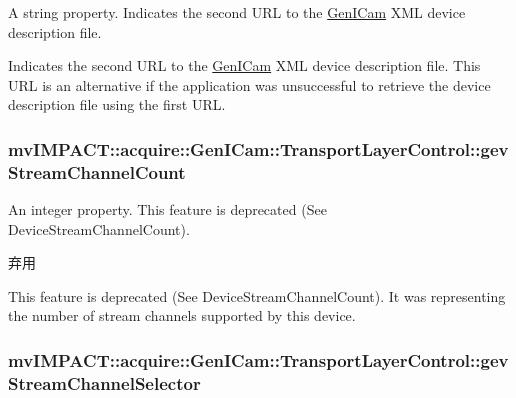 A string property. Indicates the second U\+R\+L to the \hyperlink{namespacemv_i_m_p_a_c_t_1_1acquire_1_1_gen_i_cam}{Gen\+I\+Cam} X\+M\+L device description file. 

Indicates the second U\+R\+L to the \hyperlink{namespacemv_i_m_p_a_c_t_1_1acquire_1_1_gen_i_cam}{Gen\+I\+Cam} X\+M\+L device description file. This U\+R\+L is an alternative if the application was unsuccessful to retrieve the device description file using the first U\+R\+L. \hypertarget{classmv_i_m_p_a_c_t_1_1acquire_1_1_gen_i_cam_1_1_transport_layer_control_aa79a69d74d942c7937ec0b45a8ac95ce}{
\subsubsection[{gev\+Stream\+Channel\+Count}]{ mv\+I\+M\+P\+A\+C\+T\+::acquire\+::\+Gen\+I\+Cam\+::\+Transport\+Layer\+Control\+::gev\+Stream\+Channel\+Count}}\label{classmv_i_m_p_a_c_t_1_1acquire_1_1_gen_i_cam_1_1_transport_layer_control_aa79a69d74d942c7937ec0b45a8ac95ce}


An integer property. This feature is deprecated (See Device\+Stream\+Channel\+Count). 

\begin{DoxyRefDesc}{弃用}
\item[\hyperlink{deprecated__deprecated000069}{弃用}]This feature is deprecated (See Device\+Stream\+Channel\+Count). It was representing the number of stream channels supported by this device. \end{DoxyRefDesc}
\hypertarget{classmv_i_m_p_a_c_t_1_1acquire_1_1_gen_i_cam_1_1_transport_layer_control_a7e227c7c97a21cfeaa0d8e1a08a0ee3d}{
\subsubsection[{gev\+Stream\+Channel\+Selector}]{ mv\+I\+M\+P\+A\+C\+T\+::acquire\+::\+Gen\+I\+Cam\+::\+Transport\+Layer\+Control\+::gev\+Stream\+Channel\+Selector}}\label{classmv_i_m_p_a_c_t_1_1acquire_1_1_gen_i_cam_1_1_transport_layer_control_a7e227c7c97a21cfeaa0d8e1a08a0ee3d}


